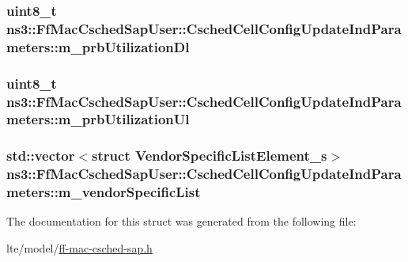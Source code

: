 \subsubsection[{\texorpdfstring{m\+\_\+prb\+Utilization\+Dl}{m_prbUtilizationDl}}]{\setlength{\rightskip}{0pt plus 5cm}uint8\+\_\+t ns3\+::\+Ff\+Mac\+Csched\+Sap\+User\+::\+Csched\+Cell\+Config\+Update\+Ind\+Parameters\+::m\+\_\+prb\+Utilization\+Dl}\hypertarget{structns3_1_1FfMacCschedSapUser_1_1CschedCellConfigUpdateIndParameters_aff8a5a5d0aecb6d5cb61bf34f03bdc6a}{}\label{structns3_1_1FfMacCschedSapUser_1_1CschedCellConfigUpdateIndParameters_aff8a5a5d0aecb6d5cb61bf34f03bdc6a}
\subsubsection[{\texorpdfstring{m\+\_\+prb\+Utilization\+Ul}{m_prbUtilizationUl}}]{\setlength{\rightskip}{0pt plus 5cm}uint8\+\_\+t ns3\+::\+Ff\+Mac\+Csched\+Sap\+User\+::\+Csched\+Cell\+Config\+Update\+Ind\+Parameters\+::m\+\_\+prb\+Utilization\+Ul}\hypertarget{structns3_1_1FfMacCschedSapUser_1_1CschedCellConfigUpdateIndParameters_a459f3eae278f1cc51825eb4d60639fcf}{}\label{structns3_1_1FfMacCschedSapUser_1_1CschedCellConfigUpdateIndParameters_a459f3eae278f1cc51825eb4d60639fcf}
\subsubsection[{\texorpdfstring{m\+\_\+vendor\+Specific\+List}{m_vendorSpecificList}}]{\setlength{\rightskip}{0pt plus 5cm}std\+::vector$<$struct {\bf Vendor\+Specific\+List\+Element\+\_\+s}$>$ ns3\+::\+Ff\+Mac\+Csched\+Sap\+User\+::\+Csched\+Cell\+Config\+Update\+Ind\+Parameters\+::m\+\_\+vendor\+Specific\+List}\hypertarget{structns3_1_1FfMacCschedSapUser_1_1CschedCellConfigUpdateIndParameters_ab961d93445d20b376c736083f2115713}{}\label{structns3_1_1FfMacCschedSapUser_1_1CschedCellConfigUpdateIndParameters_ab961d93445d20b376c736083f2115713}


The documentation for this struct was generated from the following file\+:\begin{DoxyCompactItemize}
\item 
lte/model/\hyperlink{ff-mac-csched-sap_8h}{ff-\/mac-\/csched-\/sap.\+h}\end{DoxyCompactItemize}
